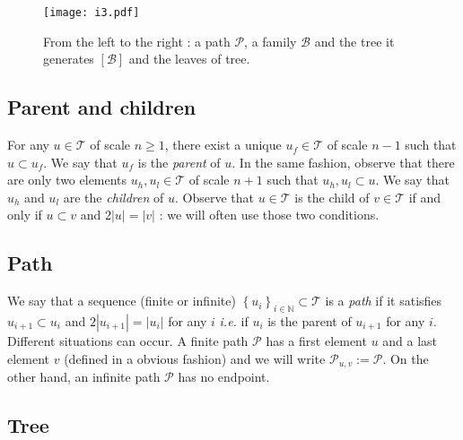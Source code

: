\documentclass{article}
\begin{document}
\begin{figure}[h!]
\centering
\texttt{[image: i3.pdf]}
\caption{From the left to the right : a path $\mathcal{P}$, a family $\mathcal{B}$ and the tree it generates $[\mathcal{B}]$ and the leaves of tree.}  
\end{figure}



\subsection*{Parent and children}




For any $u \in \mathcal{T}$ of scale $n \geq 1$, there exist a unique $u_f \in \mathcal{T}$ of scale $n-1$ such that  $u \subset u_f$. We say that $u_f$ is the \textit{parent} of $u$. In the same fashion, observe that there are only two elements $u_h,u_l \in \mathcal{T}$ of scale $n+1$ such that $u_h,u_l \subset u$. We say that $u_h$ and $u_l$ are the \textit{children} of $u$. Observe that $u \in \mathcal{T}$ is the child of $v \in \mathcal{T}$ if and only if $u \subset v$ and $2|u| = |v|$ : we will often use those two conditions.


\subsection*{Path}

We say that a sequence (finite or infinite) $\left\{ u_i \right\}_{i \in \mathbb{N}}  \subset \mathcal{T}$ is a \textit{path} if it satisfies $u_{i+1} \subset u_i$ and $2|u_{i+1}| = |u_i| $ for any $i$ \textit{i.e.} if $u_i$ is the parent of $u_{i+1}$ for any $i$. Different situations can occur. A finite path $\mathcal{P}$ has a first element $u$ and a last element $v$ (defined in a obvious fashion) and we will write $\mathcal{P}_{u,v} := \mathcal{P}$. On the other hand, an infinite path $\mathcal{P}$ has no endpoint.


\subsection*{Tree}
\end{document}
